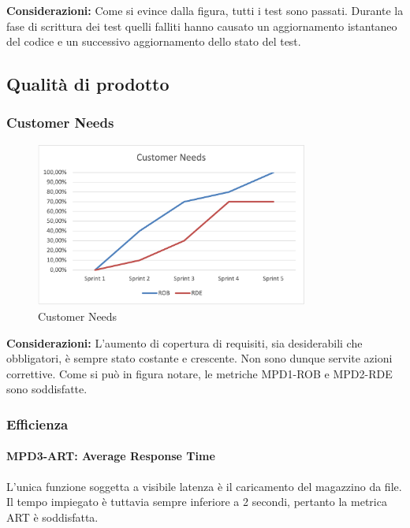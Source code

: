 \noindent \textbf{Considerazioni:} Come si evince dalla figura, tutti i test sono passati. Durante la fase di scrittura dei test quelli falliti hanno causato un aggiornamento istantaneo del codice e un successivo aggiornamento dello stato del test. 

\subsection{Qualità di prodotto}

\subsubsection{Customer Needs}

\begin{figure}[h!] 
    \centering
    \includegraphics[width=0.8\textwidth]{images/Customer Needs.png}
    \caption{Customer Needs}
\end{figure}

\noindent \textbf{Considerazioni:} L'aumento di copertura di requisiti, sia desiderabili che obbligatori, è sempre stato costante e crescente. Non sono dunque servite azioni correttive.
Come si può in figura notare, le metriche MPD1-ROB e MPD2-RDE sono soddisfatte.

\subsubsection{Efficienza}

\paragraph{MPD3-ART: Average Response Time}
L'unica funzione soggetta a visibile latenza è il caricamento del magazzino da file. Il tempo impiegato è tuttavia sempre inferiore a 2 secondi, pertanto la metrica ART è soddisfatta.

